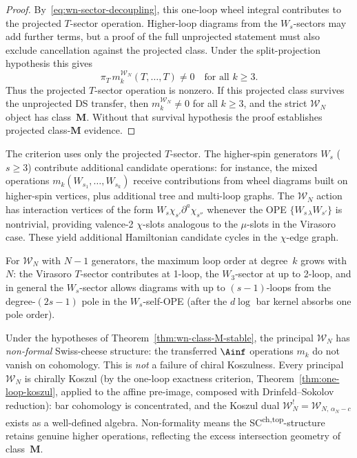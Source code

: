 \begin{proof}
By~\eqref{eq:wn-sector-decoupling}, this one-loop wheel integral
contributes to the projected $T$-sector operation. Higher-loop
diagrams from the $W_s$-sectors may add further terms, but a proof of
the full unprojected statement must also exclude cancellation against
the projected class. Under the split-projection hypothesis this gives
\[
\pi_T\,m_k^{\mathcal{W}_N}(T, \ldots, T) \ne 0
\quad\text{for all } k \ge 3.
\]
Thus the projected $T$-sector operation is nonzero. If this projected
class survives the unprojected DS transfer, then
$m_k^{\mathcal W_N}\ne0$ for all $k\ge3$, and the strict
$\mathcal W_N$ object has class~$\mathbf M$. Without that survival
hypothesis the proof establishes projected class-$\mathbf M$ evidence.
\end{proof}

\begin{remark}
\label{rem:wn-additional-diagrams}
%
The criterion uses only the projected $T$-sector. The higher-spin
generators $W_s$ ($s \ge 3$) contribute additional
candidate operations: for instance, the mixed operations
$m_k(W_{s_1}, \ldots, W_{s_k})$ receive contributions
from wheel diagrams built on higher-spin vertices, plus
additional tree and multi-loop graphs. The $\mathcal{W}_N$
action has interaction vertices of the form
$W_s \chi_{s'} \partial^{a} \chi_{s''}$ whenever the OPE
$\{W_{s\,\lambda} W_{s'}\}$ is nontrivial, providing
valence-2 $\chi$-slots analogous to the $\mu$-slots
in the Virasoro case. These yield additional Hamiltonian
candidate cycles in the $\chi$-edge graph.

For $\mathcal{W}_N$ with $N-1$ generators, the maximum
loop order at degree~$k$ grows with $N$: the Virasoro
$T$-sector contributes at 1-loop, the $W_3$-sector at up to
2-loop, and in general the $W_s$-sector allows diagrams
with up to $(s-1)$-loops from the degree-$(2s-1)$ pole in the
$W_s$-self-OPE (after the $d\log$ bar kernel absorbs one pole order).
\end{remark}

\begin{remark}
\label{rem:wn-koszul-nonformality}
%
Under the hypotheses of Theorem~\ref{thm:wn-class-M-stable}, the
principal $\mathcal{W}_N$ has \emph{non-formal} Swiss-cheese
structure: the transferred $\Ainf$ operations $m_k$ do not vanish on
cohomology. This is \emph{not} a failure of chiral Koszulness.
Every principal $\mathcal{W}_N$ is chirally Koszul
\textup{(}by the one-loop exactness criterion,
Theorem~\textup{\ref{thm:one-loop-koszul}},
applied to the affine pre-image, composed with
Drinfeld--Sokolov reduction\textup{)}: bar cohomology is
concentrated, and the Koszul dual
$\mathcal{W}_N^! = \mathcal{W}_{N,\,\alpha_N - c}$
exists as a well-defined algebra. Non-formality means
the SC\textsuperscript{ch,top}-structure
retains genuine higher operations, reflecting the excess
intersection geometry of class~$\mathbf{M}$.
\end{remark}

